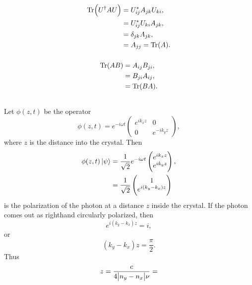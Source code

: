 \documentclass[a4paper,12pt,twoside]{article}
\begin{document}
\begin{multicols*}{2}
\subsection{}%
\subsubsection{}
\begin{align}
	\Tr(U^\dagger A U) &= U^*_{ij}A_{jk}U_{ki},\\
	&= U^*_{ij}U_{ki}A_{jk},\\
	&= \delta_{jk} A_{jk},\\
	&= A_{jj} = \Tr(A).
\end{align}
\subsubsection{}
\begin{align}
	\Tr(AB) &= A_{ij}B_{ji},\\
	&= B_{ji}A_{ij},\\
	&= \Tr(BA).
\end{align}
\subsection{}%
Let $\phi(z,t)$ be the operator
\begin{equation}
	\phi(z,t) = e^{-i\omega t} \begin{pmatrix}
		e^{ik_x z} & 0 \\
		0 & e^{-ik_y z}
	\end{pmatrix},
\end{equation}
where $z$ is the distance into the crystal.
Then
\begin{align}
	\phi(z,t)\ket{\psi} &= \frac{1}{\sqrt{2}} e^{-i\omega t} \begin{pmatrix}
		e^{ik_x z}\\ e^{ik_y z}
	\end{pmatrix},\\
	&= \frac{1}{\sqrt{2}} \begin{pmatrix}
		1\\ e^{i(k_y-k_x) z}
	\end{pmatrix}
\end{align}
is the polarization of the photon at a distance $z$ inside the crystal.
If the photon comes out as righthand circularly polarized, then
\begin{equation}
	e^{i(k_y-k_x)z} = i,
\end{equation}
or
\begin{equation}
	(k_y-k_x)z = \frac{\pi}{2}.
\end{equation}
Thus
\begin{equation}
	z = \frac{c}{4\abs{n_y-n_x} \nu} =
\end{equation}

\end{multicols*}
\end{document}
